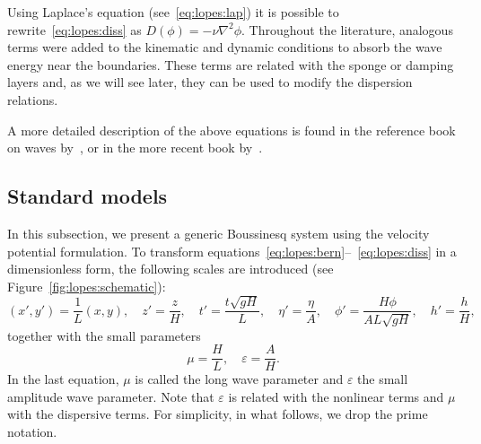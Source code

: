 Using Laplace's equation (see~\eqref{eq:lopes:lap}) it
is possible to rewrite~\eqref{eq:lopes:diss} as
$D(\phi)=-\nu\nabla^2\phi$.  Throughout the literature,
analogous terms were added to the kinematic and dynamic
conditions to absorb the wave energy near the boundaries.
These terms are related with the sponge or damping layers
and, as we will see later, they can be used to modify the
dispersion relations.

A more detailed description of the above equations is found
in the reference book on waves by~\citet{Whitham1974}, or in
the more recent book by~\citet{Johnson1997}.

\subsection{Standard models}
In this subsection, we present a generic Boussinesq system
using the velocity potential formulation.  To transform
equations~\eqref{eq:lopes:bern}--~\eqref{eq:lopes:diss}
in a dimensionless form, the following scales are
introduced (see Figure~\ref{fig:lopes:schematic}):
\begin{equation}
( x', y')=\frac{1}{L}(x,y),\quad z'=\frac{z}{H}, \quad
  t'=\frac{t\sqrt{gH}}{L},\quad \eta'=\frac{\eta}{A},\quad
  \phi'= \frac{H\phi}{AL\sqrt{gH}},\quad h'=\frac{h}{H},
\end{equation}
together with the small parameters
\begin{equation}
\mu=\frac{H}{L},\quad \varepsilon=\frac{A}{H}.
\end{equation}
In the last equation, $\mu$ is called the long wave
parameter and $\varepsilon$ the small amplitude wave
parameter.  Note that $\varepsilon$ is related with the
nonlinear terms and $\mu$ with the dispersive terms.  For
simplicity, in what follows, we drop the prime notation.


